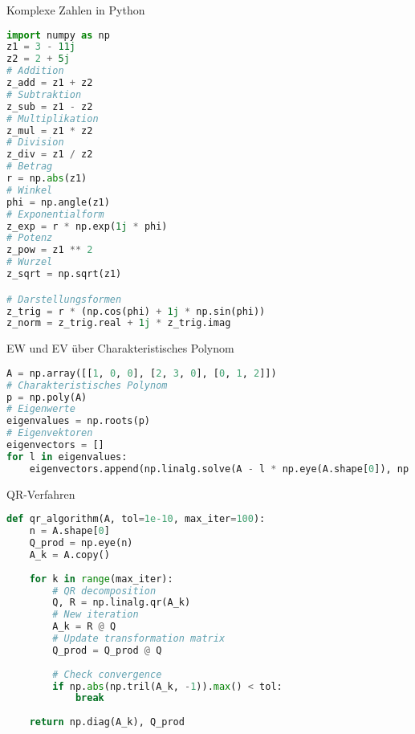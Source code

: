 \begin{examplecode}{Komplexe Zahlen in Python}
\begin{lstlisting}[language=Python, style=basesmol]
import numpy as np
z1 = 3 - 11j
z2 = 2 + 5j
# Addition
z_add = z1 + z2
# Subtraktion
z_sub = z1 - z2
# Multiplikation
z_mul = z1 * z2
# Division
z_div = z1 / z2
# Betrag
r = np.abs(z1)
# Winkel
phi = np.angle(z1)
# Exponentialform
z_exp = r * np.exp(1j * phi)
# Potenz
z_pow = z1 ** 2
# Wurzel
z_sqrt = np.sqrt(z1)

# Darstellungsformen
z_trig = r * (np.cos(phi) + 1j * np.sin(phi))
z_norm = z_trig.real + 1j * z_trig.imag
\end{lstlisting}
\end{examplecode}

\begin{examplecode}{EW und EV über Charakteristisches Polynom}
\begin{lstlisting}[language=Python, style=basesmol]
A = np.array([[1, 0, 0], [2, 3, 0], [0, 1, 2]])
# Charakteristisches Polynom
p = np.poly(A)
# Eigenwerte
eigenvalues = np.roots(p)
# Eigenvektoren
eigenvectors = []
for l in eigenvalues:
    eigenvectors.append(np.linalg.solve(A - l * np.eye(A.shape[0]), np.zeros(A.shape[0])))
\end{lstlisting}
\end{examplecode}

\begin{examplecode}{QR-Verfahren}
\begin{lstlisting}[language=Python, style=basesmol]
def qr_algorithm(A, tol=1e-10, max_iter=100):
    n = A.shape[0]
    Q_prod = np.eye(n)
    A_k = A.copy()
    
    for k in range(max_iter):
        # QR decomposition
        Q, R = np.linalg.qr(A_k)
        # New iteration
        A_k = R @ Q
        # Update transformation matrix
        Q_prod = Q_prod @ Q
        
        # Check convergence
        if np.abs(np.tril(A_k, -1)).max() < tol:
            break
            
    return np.diag(A_k), Q_prod
\end{lstlisting}
\end{examplecode}